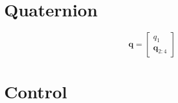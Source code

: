 \documentclass{article}
\title{
\vspace{2in}
\textmd{\textbf{\noteTitle}}\\
\normalsize\vspace{0.1in}\small{\noteCreationDate}\\
\vspace{3in}
}
\author{\textbf{\noteAuthorName}}
\date{} %
\begin{document}
\maketitle



\newpage


\section{Quaternion}

\begin{equation}
	\textbf{q} = \begin{bmatrix}
		q_1 \\
		\textbf{q}_{2:4}
	\end{bmatrix}
\end{equation}

\section{Control}

\clearpage





\end{document}
